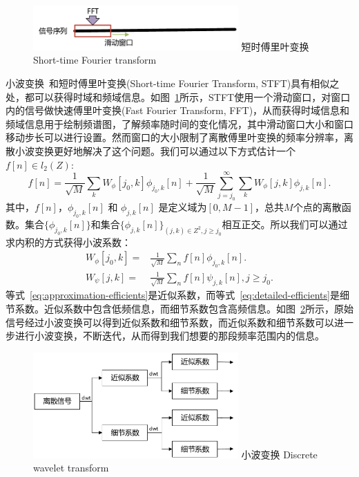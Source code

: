 \begin{figure}[!htp]
  \centering
  \includegraphics[width=0.7\textwidth]{figure/stft.pdf}
  \bicaption
    {短时傅里叶变换}
    {Short-time Fourier transform}
  \label{fig:stft}
\end{figure}
小波变换~\cite{chun2010tutorial}和短时傅里叶变换(Short-time Fourier Transform, STFT)具有相似之处，都可以获得时域和频域信息。如图~\ref{fig:stft}所示，STFT使用一个滑动窗口，对窗口内的信号做快速傅里叶变换(Fast Fourier Transform, FFT)，从而获得时域信息和频域信息用于绘制频谱图，了解频率随时间的变化情况，其中滑动窗口大小和窗口移动步长可以进行设置。然而窗口的大小限制了离散傅里叶变换的频率分辨率，离散小波变换更好地解决了这个问题。我们可以通过以下方式估计一个$f[n] \in l_{2}(Z)$:
\begin{equation}
f[n] = \frac{1}{\sqrt{M}}\sum_{k} W_{\phi}[j_{0},k]\phi_{j_{0},k}[n] + \frac{1}{\sqrt{M}}\sum_{j=j_{0}}^{\infty}\sum_{k}W_{\phi}[j,k]\phi_{j,k}[n].
\end{equation}
其中，$f[n]$，$\phi_{j_{0},k}[n]$ 和 $\phi_{j,k}[n]$ 是定义域为$[0,M-1]$，总共$M$个点的离散函数。集合$\{\phi_{j_{0},k}[n]\}$和集合$\{\phi_{j,k}[n]\}_{(j,k)\in Z^{2}, j \geq j_{0}}$相互正交。所以我们可以通过求内积的方式获得小波系数：
\begin{align}
W_{\phi}[j_{0},k]=&\frac{1}{\sqrt{M}}\sum_{n}f[n]\phi_{j_{0},k}[n]. \label{eq:approximation-efficients} \\
W_{\psi}[j,k] =& \frac{1}{\sqrt{M}}\sum_{n}f[n]\psi_{j,k}[n],  j \geq j_{0}. \label{eq:detailed-efficients}
\end{align}
等式~\ref{eq:approximation-efficients}是近似系数，而等式~\ref{eq:detailed-efficients}是细节系数。近似系数中包含低频信息，而细节系数包含高频信息。如图~\ref{fig:dwt}所示，原始信号经过小波变换可以得到近似系数和细节系数，而近似系数和细节系数可以进一步进行小波变换，不断迭代，从而得到我们想要的那段频率范围内的信息。
\begin{figure}[!htp]
  \centering
  \includegraphics[width=0.7\textwidth]{figure/dwt.pdf}
  \bicaption
    {小波变换}
    {Discrete wavelet transform}
  \label{fig:dwt}
\end{figure}


